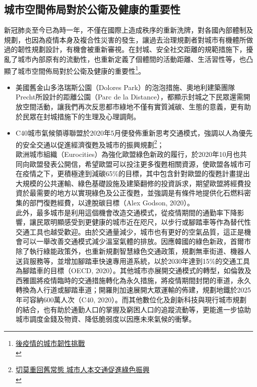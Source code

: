 \documentclass[a4paper,12pt]{article}
\begin{document}
\subsection{城市空間佈局對於公衛及健康的重要性}
\label{sec:org1704488}
新冠肺炎至今已為時一年，不僅在國際上造成秩序的重新洗牌，對各國內部體制及規劃，也因為疫情本身及複合性災害的發生，讓過去治理規劃者對城市有機體所做過的韌性規劃設計，有機會被重新審視。在封城、安全社交距離的規範措施下，擾亂了城市內部原有的流動性，也重新定義了個體間的活動距離、生活習性等，也凸顯了城市空間佈局對於公衛及健康的重要性\footnote{\href{https://rsprc.ntu.edu.tw/zh-tw/m01-3/understand-risk-society/1550-1100222-covid.html}{ 後疫情的城市韌性挑戰 }\\}。\\
\begin{itemize}
\item 美國舊金山多洛瑞斯公園（Dolores Park）的泡泡措施、奧地利建築團隊Precht所設計的距離公園（Parc de la Distance），都顯示封城之下民眾還需開放空間活動，讓我們再次反思都市綠地不僅有實質減碳、生態的意義，更有助於民眾在封城措施下的生理及心理調劑。\\
\item C40城市氣候領導聯盟於2020年5月便發佈重新思考交通模式，強調以人為優先的安全交通以促進經濟復甦及城市的振興規劃\footnote{\href{https://rsprc.ntu.edu.tw/zh-tw/m01-3/en-trans/1430-1090525-green-recovery2.html}{ 切莫重回舊常態 城市人本交通促進綠色振興 }\\\label{org2c5825e}}；\\
歐洲城市組織（Eurocities）為強化歐盟綠色新政的履行，於2020年10月也共同向歐盟發表公開信，希望歐盟可以投注更多復甦相關資源，使歐盟各城市可在疫情之下，更積極達到減碳65\%的目標，其中包含針對歐盟的復甦計畫提出大規模的公共運輸、綠色基礎設施及建築翻修的投資訴求，期望歐盟將經費投資於最需要的地方以實現綠色及公正復甦，並強調是有條件地提供化石燃料密集的部門復甦經費，以達脫碳目標（Alex Godson, 2020）。\\

此外，最多城市是利用這個機會改造交通模式，從疫情期間的通勤率下降影響，讓民眾明顯感受到更健康的城市近在咫尺，以步行或腳踏車等作為替代性交通工具也越受歡迎。由於交通量減少，城市也有更好的空氣品質，這正是機會可以一舉改善交通模式減少溫室氣體的排放。因應韓國的綠色新政，首爾市除了執行綠能政策外，也重新規劃智慧綠色交通政策，規劃無車街道、機器人送貨服務等，並增加腳踏車快速專用道系統，以於2030年達到15\%的交通工具為腳踏車的目標（OECD, 2020）。其他城市亦展開交通模式的轉型，如倫敦及西雅圖將疫情臨時的交通措施轉化為永久措施，將疫情期間封閉的車道，永久轉換為人行道或腳踏車道；開羅則加速展開大眾運輸的佈建，規劃地鐵於2025年可容納600萬人次（C40, 2020）。而其他數位化及創新科技與現行城市規劃的結合，也有助於通勤人口的掌握及窮困人口的追蹤流動等，更能進一步協助城市調度金錢及物資、降低脆弱度以因應未來氣候的衝擊。\\


\end{itemize}
\end{document}
